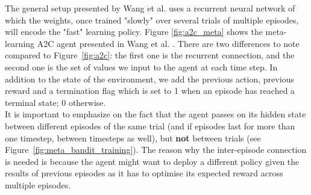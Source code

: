 The general setup presented by Wang et al. uses a recurrent neural network of
which the weights, once trained "slowly" over several trials of multiple
episodes, will encode the "fast" learning policy.
Figure \ref{fig:a2c_meta} shows the meta-learning A2C agent presented in Wang
et al. \cite{learningtorl}. There are two differences to note compared to
Figure~\ref{fig:a2c}: the first one is the recurrent connection, and the
second one is the set of values we input to the agent at each time step. In
addition to the state of the environment, we add the previous action, 
previous reward and a termination flag which is set to 1 when an episode
has reached a terminal state; 0 otherwise.\\

It is important to emphasize on the fact that the agent passes on its hidden
state between different episodes of the same trial (and if episodes last for
more than one timestep, between timesteps as well), but \textbf{not} between
trials (see Figure~\ref{fig:meta_bandit_training}).
The reason why the inter-episode connection is needed is because
the agent might want to deploy a different policy given the results of 
previous episodes as it has to optimise its expected reward across multiple
episodes.

